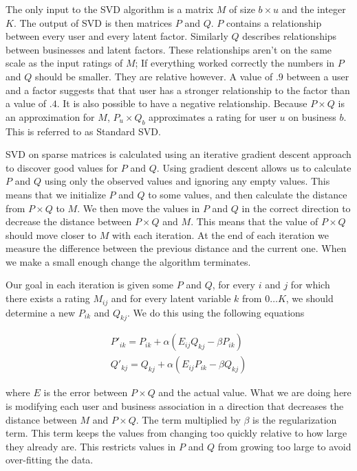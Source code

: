 The only input to the SVD algorithm is a matrix $M$ of size $b \times u$ and the
integer $K$. The output of SVD is then matrices $P$ and $Q$. $P$ contains a
relationship between every user and every latent factor. Similarly $Q$ describes
relationships between businesses and latent factors. These relationships aren't
on the same scale as the input ratings of $M$; If everything worked correctly
the numbers in $P$ and $Q$ should be smaller. They are relative however. A value
of $.9$ between a user and a factor suggests that that user has a stronger
relationship to the factor than a value of $.4$. It is also possible to have a
negative relationship. Because $P \times Q$ is an
approximation for $M$, $P_u \times Q_b$ approximates a rating for user $u$ on
business $b$. This is referred to as Standard SVD\cite{bellkor}.

SVD on sparse matrices is calculated using an iterative gradient descent
approach to discover good values for $P$ and $Q$. Using gradient descent allows
us to calculate $P$ and $Q$ using only the observed values and ignoring any
empty values. This means that we initialize $P$ and $Q$ to some values, and
then calculate the distance from $P \times Q$ to $M$. We then move the values
in $P$ and $Q$ in the correct direction to decrease the distance between $P
\times Q$ and $M$. This means that the value of $P \times Q$ should move closer
to $M$ with each iteration. At the end of each iteration we measure the
difference between the previous distance and the current one. When we make a
small enough change the algorithm terminates.

Our goal in each iteration is given some $P$ and $Q$, for every $i$ and $j$ for
which there exists a rating $M_{ij}$ and for every latent variable $k$ from
$0\ldots K$, we should determine a new $P_{ik}$ and $Q_{kj}$. We do this using the
following equations

\[
\begin{array}{c}
P'_{ik}=P_{ik} + \alpha(E_{ij}Q_{kj}-\beta P_{ik}) \\
Q'_{kj}=Q_{kj} + \alpha(E_{ij}P_{ik}-\beta Q_{kj})
\end{array}
\]

\noindent where $E$ is the error between $P \times Q$ and the actual value. What
we are doing here is modifying each user and business association in a direction
that decreases the distance between $M$ and $P \times Q$. The term multiplied by
$\beta$ is the regularization term. This term keeps the values from changing too
quickly relative to how large they already are. This restricts values in $P$ and
$Q$ from growing too large to avoid over-fitting the data.

